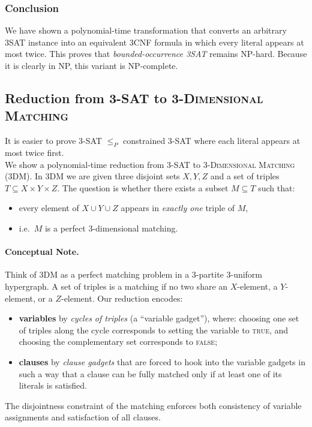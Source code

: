 \documentclass[9pt]{extarticle}
\begin{document}
\subsubsection*{Conclusion}

We have shown a polynomial-time transformation that converts an arbitrary 3SAT
instance into an equivalent 3CNF formula in which every literal appears at most
twice. This proves that \emph{bounded-occurrence 3SAT} remains NP-hard. Because
it is clearly in NP, this variant is NP-complete.


\subsection{Reduction from \textsc{3-SAT} to \textsc{3-Dimensional Matching}}
It is easier to prove 3-SAT $\leq_P$ constrained 3-SAT where each literal appears at most twice first.\\
We show a polynomial-time reduction from \textsc{3-SAT} to
\textsc{3-Dimensional Matching} (\textsc{3DM}).  In \textsc{3DM} we are given
three disjoint sets \(X,Y,Z\) and a set of triples
\(T \subseteq X \times Y \times Z\).  The question is whether there exists a
subset \(M \subseteq T\) such that:
\begin{itemize}
    \item every element of \(X \cup Y \cup Z\) appears in \emph{exactly one} triple of \(M\),
    \item i.e.\ \(M\) is a perfect 3-dimensional matching.
\end{itemize}

\paragraph{Conceptual Note.}
Think of \textsc{3DM} as a perfect matching problem in a 3-partite 3-uniform
hypergraph.  A set of triples is a matching if no two share an \(X\)-element, a
\(Y\)-element, or a \(Z\)-element.  Our reduction encodes:
\begin{itemize}
    \item \textbf{variables} by \emph{cycles of triples} (a ``variable gadget''), where:
          choosing one set of triples along the cycle corresponds to setting the
          variable to \textsc{true}, and choosing the complementary set
          corresponds to \textsc{false};
    \item \textbf{clauses} by \emph{clause gadgets} that are forced to hook
          into the variable gadgets in such a way that a clause can be fully
          matched only if at least one of its literals is satisfied.
\end{itemize}
The disjointness constraint of the matching enforces both consistency of
variable assignments and satisfaction of all clauses. 
\end{document}
